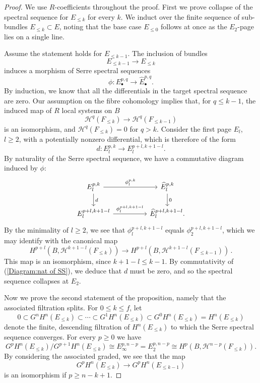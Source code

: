 \documentclass[oneside, 12pt, a4paper]{amsart}
\numberwithin{equation}{section}
\theoremstyle{plain}
\theoremstyle{definition}
\theoremstyle{remark}
\begin{document}
\begin{proof}
We use $R$-coefficients throughout the proof. First we prove collapse of the spectral sequence for $E_{\leq k}$ for every $k$. We induct over the finite sequence of sub-bundles $E_{\leq k}\subset E$, noting that the base case $E_{\leq 0}$ follows at once as the $E_2$-page lies on a single line.

Assume the statement holds for $E_{\leq k-1}$. The inclusion of bundles \[E_{\leq k-1}\to E_{\leq k}\] induces a morphism of Serre spectral sequences \[\phi:E^{p,q}_{\bullet}\to \widehat{E}^{p,q}_{\bullet}.\] By induction, we know that all the differentials in the target spectral sequence are zero. Our assumption on the fibre cohomology implies that, for $q\leq k-1$, the induced map of $R$ local systems on $B$ \[\mathcal{H}^q(F_{\leq k})\to \mathcal{H}^q(F_{\leq k-1})\] is an isomorphism, and $\mathcal{H}^q(F_{\leq k})=0$ for $q> k$. Consider the first page $E_l$, $l\geq 2$, with a potentially nonzero differential, which is therefore of the form \[d:E_l^{p,k}\to E_l^{p+l,k+1-l}.\]
By naturality of the Serre spectral sequence, we have a commutative diagram induced by $\phi$:
\begin{equation}\label{Diagram:nat of SS}
    \begin{tikzcd}
E^{p,k}_{l}\arrow[d,"d"]\arrow[rr,"\phi_l^{p,k}"]&& \widehat{E}^{p,k}_{l}\arrow[d,"0"]\\
E^{p+l,k+1-l}_{l}\arrow[rr,"\phi_l^{p+l,k+1-l}"]&& \widehat{E}^{p+l,k+1-l}_{l}.
\end{tikzcd}
\end{equation}
By the minimality of $l\geq 2$, we see that $\phi_l^{p+l,k+1-l}$ equals $\phi_2^{p+l,k+1-l}$, which we may identify with the canonical map
 \[H^{p+l}(B,\mathcal{H}^{k+1-l}(F_{\leq k}))\to H^{p+l}(B,\mathcal{H}^{k+1-l}(F_{\leq k-1}))\, .\]
This map is an isomorphism, since $k+1-l\leq k-1$. By commutativity of (\ref{Diagram:nat of SS}), we deduce that $d$ must be zero, and so the spectral sequence collapses at $E_2$.
 
 
Now we prove the second statement of the proposition, namely that the associated filtration splits. For $0\leq k \leq f$, let
\[
0\subset G^nH^n(E_{\leq k})\subset \cdots \subset G^{1}H^n(E_{\leq k})\subset G^{0}H^n(E_{\leq k})=H^n(E_{\leq k})
\]
denote the finite, descending filtration of $H^n(E_{\leq k})$ to which the Serre spectral sequence converges. For every $p\geq 0$ we have
 \[G^pH^n(E_{\leq k})/G^{p+1}H^n(E_{\leq k})\cong E^{p,n-p}_\infty=E_2^{p,n-p}\cong H^p(B,\mathcal{H}^{n-p}(F_{\leq k})).\]
By considering the associated graded, we see that the map \[G^pH^n(E_{\leq k})\to G^pH^n(E_{\leq k-1})\] is an isomorphism if $p\geq n-k+1$.


\end{proof}
\end{document}
